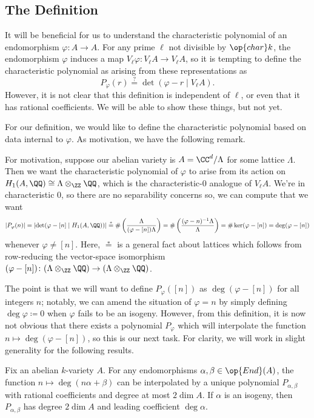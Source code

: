 \documentclass{amsart}
\begin{document}
\subsection{The Definition}
It will be beneficial for us to understand the characteristic polynomial of an endomorphism $\varphi\colon A\to A$. For any prime $\ell$ not divisible by $\op{char}k$, the endomorphism $\varphi$ induces a map $V_\ell\varphi\colon V_\ell A\to V_\ell A$, so it is tempting to define the characteristic polynomial as arising from these representations as
\[P_\varphi(r)\stackrel?=\det(\varphi-r\mid V_\ell A).\]
However, it is not clear that this definition is independent of $\ell$, or even that it has rational coefficients. We will be able to show these things, but not yet.

For our definition, we would like to define the characteristic polynomial based on data internal to $\varphi$. As motivation, we have the following remark.
\begin{remark}
	For motivation, suppose our abelian variety is $A=\CC^d/\Lambda$ for some lattice $\Lambda$. Then we want the characteristic polynomial of $\varphi$ to arise from its action on $H_1(A,\QQ)\cong\Lambda\otimes_\ZZ\QQ$, which is the characteristic-$0$ analogue of $V_\ell A$. We're in characteristic $0$, so there are no separability concerns so, we can compute that we want
	\[\left|P_\varphi(n)\right|=\left|\det(\varphi-[n]\mid H_1(A,\QQ))\right|\stackrel*=\#\left(\frac{\Lambda}{(\varphi-[n])\Lambda}\right)=\#\left(\frac{(\varphi-n)^{-1}\Lambda}{\Lambda}\right)=\#\ker(\varphi-[n])=\deg(\varphi-[n])\]
	whenever $\varphi\ne [n]$. Here, $\stackrel*=$ is a general fact about lattices which follows from row-reducing the vector-space isomorphism $(\varphi-[n])\colon(\Lambda\otimes_\ZZ\QQ)\to(\Lambda\otimes_\ZZ\QQ)$.
\end{remark}
The point is that we will want to define $P_\varphi([n])$ as $\deg(\varphi-[n])$ for all integers $n$; notably, we can amend the situation of $\varphi=n$ by simply defining $\deg\varphi\coloneqq0$ when $\varphi$ fails to be an isogeny. However, from this definition, it is now not obvious that there exists a polynomial $P_\varphi$ which will interpolate the function $n\mapsto\deg(\varphi-[n])$, so this is our next task. For clarity, we will work in slight generality for the following results.
\begin{lemma} \label{lem:almost-char-poly}
	Fix an abelian $k$-variety $A$. For any endomorphisms $\alpha,\beta\in\op{End}(A)$, the function $n\mapsto\deg(n\alpha+\beta)$ can be interpolated by a unique polynomial $P_{\alpha,\beta}$ with rational coefficients and degree at most $2\dim A$. If $\alpha$ is an isogeny, then $P_{\alpha,\beta}$ has degree $2\dim A$ and leading coefficient $\deg\alpha$.
\end{lemma}
\end{document}
